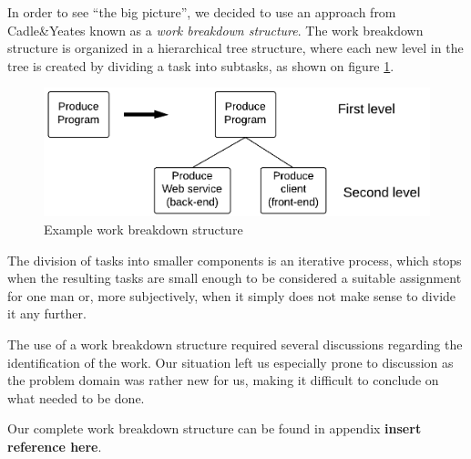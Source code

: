 In order to see “the big picture”, we decided to use an approach from Cadle\&Yeates\cite{caye} known as a \emph{work breakdown structure}. The work breakdown structure is organized in a hierarchical tree structure, where each new level in the tree is created by dividing a task into subtasks, as shown on figure \ref{fig:breakdown}.

\begin{figure}[hbtp]
    \centering
	\includegraphics[scale=0.25]{./Empiri/Planning/img/wbslevels.png}
	\caption{Example work breakdown structure} \label{fig:breakdown}
\end{figure}

The division of tasks into smaller components is an iterative process, which stops when the resulting tasks are small enough to be considered a suitable assignment for one man or, more subjectively, when it simply does not make sense to divide it any further.

The use of a work breakdown structure required several discussions regarding the identification
of the work. Our situation left us especially prone to discussion as the problem domain was rather
new for us, making it difficult to conclude on what needed to be done.

Our complete work breakdown structure can be found in appendix \textbf{insert reference here}.